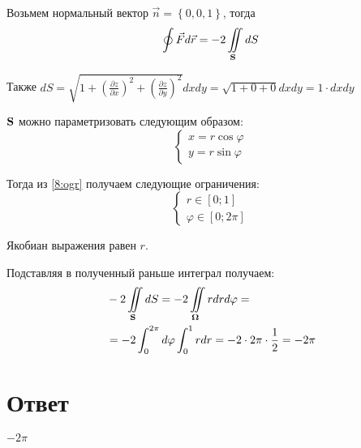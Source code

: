 \documentclass{report}
\newcommand*\doubleint[2]{\iint\limits_{#1}#2}
\newcommand*\coordchtwo[2]{
       \begin{cases}
              x = #1\\
              y = #2
       \end{cases}
}
\newcommand*\partialofby[2]{\frac{\partial #1}{\partial #2}}
\begin{document}
Возьмем нормальный вектор $\vec{n} = \left\{ 0, 0, 1 \right\}$, тогда
\begin{align*}
    \oint \vec{F} d\vec{r} = -2 \doubleint{{\bf{S}}}{dS}
\end{align*}

Также $dS = \sqrt{1 + (\partialofby{z}{x})^2 + (\partialofby{z}{y})^2}dx dy = \sqrt{1 + 0 + 0} dx dy = 1 \cdot dx dy$

${\bf{S}}$ можно параметризовать следующим образом:
$$
    \coordchtwo{r \cos \varphi}{r \sin \varphi}
$$

Тогда из \ref{8:ogr} получаем следующие ограничения:
$$
    \begin{cases}
        r \in [0;1] \\
        \varphi \in [0; 2\pi]
    \end{cases}
$$

Якобиан выражения равен $r$.

Подставляя в полученный раньше интеграл получаем:
\begin{align*}
     & -2 \doubleint{{\bf{S}}}{dS} = -2 \doubleint{{\bf{\Omega}}}{r dr d\varphi} =             \\
     & = -2 \int_{0}^{2\pi}d\varphi \int_{0}^{1}r dr = -2 \cdot 2\pi \cdot \frac{1}{2} = -2\pi
\end{align*}

\section{Ответ}

$-2\pi$
\end{document}
